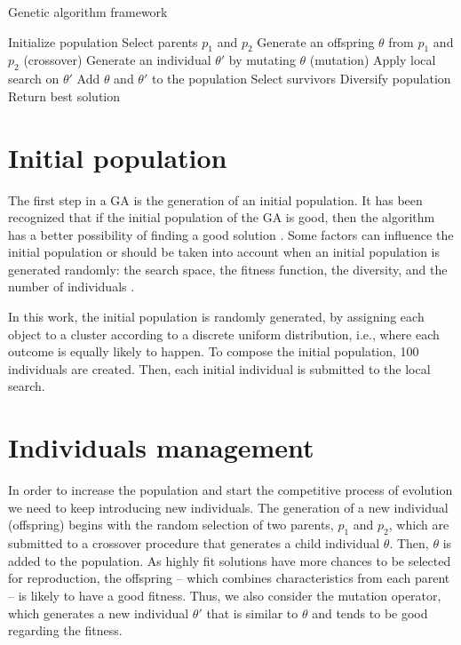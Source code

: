 \begin{algorithm}[H]
\caption{Genetic algorithm framework}
\label{genetic-algo}
\begin{algorithmic}[1]
\STATE Initialize population
\STATE Select parents $p_1$ and $p_2$
\STATE Generate an offspring $\theta$ from $p_1$ and $p_2$ (crossover)
\STATE Generate an individual $\theta'$ by mutating $\theta$ (mutation)
\STATE Apply local search on $\theta'$
\STATE Add $\theta$ and $\theta'$ to the population
\STATE Select survivors
\STATE Diversify population
\ENDIF
\ENDIF
\ENDWHILE
\STATE Return best solution
\end{algorithmic}
\end{algorithm}

\section{Initial population}
The first step in a GA is the generation of an initial population. It has been recognized that if the initial population of the GA is good, then the algorithm has a better possibility of finding a good solution \cite{Burke2004, Zitzler2000}. Some factors can influence the initial population or should be taken into account when an initial population is generated randomly: the search space, the fitness function, the diversity, and the number of individuals \cite{DiazGomez2007}.

In this work, the initial population is randomly generated, by assigning each object to a cluster according to a discrete uniform distribution, i.e., where each outcome is equally likely to happen. To compose the initial population, 100 individuals are created. Then, each initial individual is submitted to the local search.

\section{Individuals management}
In order to increase the population and start the competitive process of evolution we need to keep introducing new individuals. The generation of a new individual (offspring) begins with the random selection of two parents, $p_1$ and $p_2$, which are submitted to a crossover procedure that generates a child individual $\theta$. Then, $\theta$ is added to the population. As highly fit solutions have more chances to be selected for reproduction, the offspring -- which combines characteristics from each parent -- is likely to have a good fitness. Thus, we also consider the mutation operator, which generates a new individual $\theta'$ that is similar to $\theta$ and tends to be good regarding the fitness.

